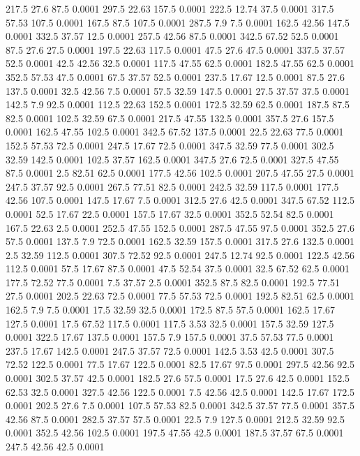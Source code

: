 217.5	27.6	87.5	0.0001
297.5	22.63	157.5	0.0001
222.5	12.74	37.5	0.0001
317.5	57.53	107.5	0.0001
167.5	87.5	107.5	0.0001
287.5	7.9	7.5	0.0001
162.5	42.56	147.5	0.0001
332.5	37.57	12.5	0.0001
257.5	42.56	87.5	0.0001
342.5	67.52	52.5	0.0001
87.5	27.6	27.5	0.0001
197.5	22.63	117.5	0.0001
47.5	27.6	47.5	0.0001
337.5	37.57	52.5	0.0001
42.5	42.56	32.5	0.0001
117.5	47.55	62.5	0.0001
182.5	47.55	62.5	0.0001
352.5	57.53	47.5	0.0001
67.5	37.57	52.5	0.0001
237.5	17.67	12.5	0.0001
87.5	27.6	137.5	0.0001
32.5	42.56	7.5	0.0001
57.5	32.59	147.5	0.0001
27.5	37.57	37.5	0.0001
142.5	7.9	92.5	0.0001
112.5	22.63	152.5	0.0001
172.5	32.59	62.5	0.0001
187.5	87.5	82.5	0.0001
102.5	32.59	67.5	0.0001
217.5	47.55	132.5	0.0001
357.5	27.6	157.5	0.0001
162.5	47.55	102.5	0.0001
342.5	67.52	137.5	0.0001
22.5	22.63	77.5	0.0001
152.5	57.53	72.5	0.0001
247.5	17.67	72.5	0.0001
347.5	32.59	77.5	0.0001
302.5	32.59	142.5	0.0001
102.5	37.57	162.5	0.0001
347.5	27.6	72.5	0.0001
327.5	47.55	87.5	0.0001
2.5	82.51	62.5	0.0001
177.5	42.56	102.5	0.0001
207.5	47.55	27.5	0.0001
247.5	37.57	92.5	0.0001
267.5	77.51	82.5	0.0001
242.5	32.59	117.5	0.0001
177.5	42.56	107.5	0.0001
147.5	17.67	7.5	0.0001
312.5	27.6	42.5	0.0001
347.5	67.52	112.5	0.0001
52.5	17.67	22.5	0.0001
157.5	17.67	32.5	0.0001
352.5	52.54	82.5	0.0001
167.5	22.63	2.5	0.0001
252.5	47.55	152.5	0.0001
287.5	47.55	97.5	0.0001
352.5	27.6	57.5	0.0001
137.5	7.9	72.5	0.0001
162.5	32.59	157.5	0.0001
317.5	27.6	132.5	0.0001
2.5	32.59	112.5	0.0001
307.5	72.52	92.5	0.0001
247.5	12.74	92.5	0.0001
122.5	42.56	112.5	0.0001
57.5	17.67	87.5	0.0001
47.5	52.54	37.5	0.0001
32.5	67.52	62.5	0.0001
177.5	72.52	77.5	0.0001
7.5	37.57	2.5	0.0001
352.5	87.5	82.5	0.0001
192.5	77.51	27.5	0.0001
202.5	22.63	72.5	0.0001
77.5	57.53	72.5	0.0001
192.5	82.51	62.5	0.0001
162.5	7.9	7.5	0.0001
17.5	32.59	32.5	0.0001
172.5	87.5	57.5	0.0001
162.5	17.67	127.5	0.0001
17.5	67.52	117.5	0.0001
117.5	3.53	32.5	0.0001
157.5	32.59	127.5	0.0001
322.5	17.67	137.5	0.0001
157.5	7.9	157.5	0.0001
37.5	57.53	77.5	0.0001
237.5	17.67	142.5	0.0001
247.5	37.57	72.5	0.0001
142.5	3.53	42.5	0.0001
307.5	72.52	122.5	0.0001
77.5	17.67	122.5	0.0001
82.5	17.67	97.5	0.0001
297.5	42.56	92.5	0.0001
302.5	37.57	42.5	0.0001
182.5	27.6	57.5	0.0001
17.5	27.6	42.5	0.0001
152.5	62.53	32.5	0.0001
327.5	42.56	122.5	0.0001
7.5	42.56	42.5	0.0001
142.5	17.67	172.5	0.0001
202.5	27.6	7.5	0.0001
107.5	57.53	82.5	0.0001
342.5	37.57	77.5	0.0001
357.5	42.56	87.5	0.0001
282.5	37.57	57.5	0.0001
22.5	7.9	127.5	0.0001
212.5	32.59	92.5	0.0001
352.5	42.56	102.5	0.0001
197.5	47.55	42.5	0.0001
187.5	37.57	67.5	0.0001
247.5	42.56	42.5	0.0001
